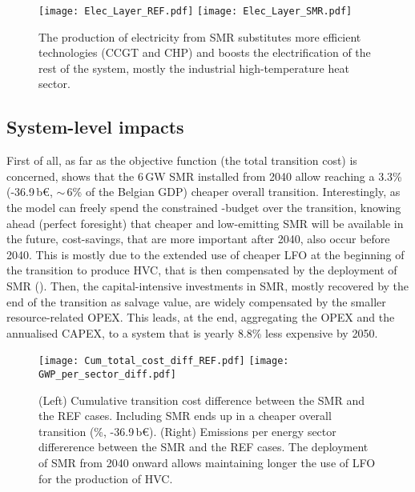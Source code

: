 \begin{figure}[htbp!]
\centering
\texttt{[image: Elec\_Layer\_REF.pdf]}
\texttt{[image: Elec\_Layer\_SMR.pdf]}
\caption{The production of electricity from \gls{SMR} substitutes more efficient technologies (\ie \gls{CCGT} and \gls{CHP}) and boosts the electrification of the rest of the system, mostly the industrial high-temperature heat sector.}
\label{fig:results_deter_layer_elec}
\end{figure}


\subsection{System-level impacts}
\label{subsec:atom_mol:results_deter_overall}
First of all, as far as the objective function (\ie the total transition cost) is concerned,  shows that the 6\,GW \gls{SMR} installed from 2040 allow reaching a 3.3\% (-36.9\,b€, $\sim$\,6\% of the Belgian GDP) cheaper overall transition. Interestingly, as the model can freely spend the constrained -budget over the transition, knowing ahead (\ie perfect foresight) that cheaper and low-emitting \gls{SMR} will be available in the future, cost-savings, that are more important after 2040, also occur before 2040. This is mostly due to the extended use of cheaper \gls{LFO} at the beginning of the transition to produce \gls{HVC}, that is then compensated by the deployment of \gls{SMR} (). Then, the capital-intensive investments in \gls{SMR}, mostly recovered by the end of the transition as salvage value, are widely compensated by the smaller resource-related OPEX. This leads, at the end, aggregating the OPEX and the annualised CAPEX, to a system that is yearly 8.8\% less expensive by 2050.

\begin{figure}[htbp!]
\centering
\texttt{[image: Cum\_total\_cost\_diff\_REF.pdf]}
\texttt{[image: GWP\_per\_sector\_diff.pdf]}
\caption{(Left) Cumulative transition cost difference between the SMR and the REF cases. Including \gls{SMR} ends up in a cheaper overall transition (\%, -36.9\,b€). (Right) Emissions per energy sector differerence between the SMR and the REF cases. The deployment of \gls{SMR} from 2040 onward allows maintaining longer the use of \acrfull{LFO} for the production of \acrfull{HVC}.}
\label{fig:results_deter_overall_emissions_sector}
\end{figure}

